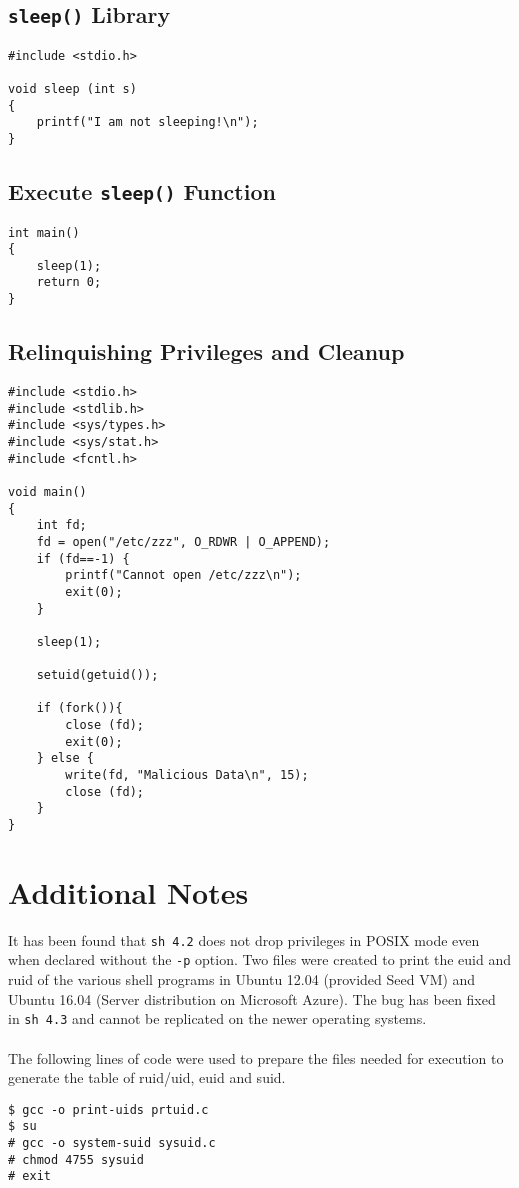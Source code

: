 \documentclass[a4paper,12pt]{article}
\begin{document}
\subsection{\texttt{sleep()} Library}
\label{Appsec:3.7}
\begin{verbatim}
#include <stdio.h>

void sleep (int s)
{
    printf("I am not sleeping!\n");
}
\end{verbatim}
\subsection{Execute \texttt{sleep()} Function}
\begin{verbatim}
int main()
{
    sleep(1);
    return 0;
}
\end{verbatim}
\newpage
\subsection{Relinquishing Privileges and Cleanup}
\label{Appsec:3.72}
\begin{verbatim}
#include <stdio.h>
#include <stdlib.h>
#include <sys/types.h>
#include <sys/stat.h>
#include <fcntl.h>

void main()
{
	int fd;
	fd = open("/etc/zzz", O_RDWR | O_APPEND);
	if (fd==-1) {
		printf("Cannot open /etc/zzz\n");
		exit(0);
	}
	
	sleep(1);
	
	setuid(getuid());
	
	if (fork()){
		close (fd);
		exit(0);
	} else {
		write(fd, "Malicious Data\n", 15);
		close (fd);
	}
}
\end{verbatim}
\newpage
\section{Additional Notes}
It has been found that \texttt{sh 4.2} does not drop privileges in POSIX mode even when declared without the \texttt{-p} option. Two files were created to print the euid and ruid of the various shell programs in Ubuntu 12.04 (provided Seed VM) and Ubuntu 16.04 (Server distribution on Microsoft Azure). The bug has been fixed in \texttt{sh 4.3} and cannot be replicated on the newer operating systems.\\\\
The following lines of code were used to prepare the files needed for execution to generate the table of ruid/uid, euid and suid.
\begin{verbatim}
$ gcc -o print-uids prtuid.c
$ su
# gcc -o system-suid sysuid.c
# chmod 4755 sysuid
# exit
\end{verbatim}
\end{document}
